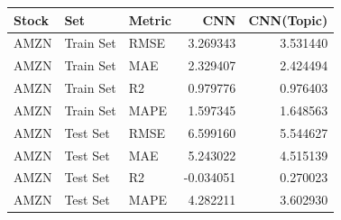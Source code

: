 \begin{tabular}{lllrr}
\toprule
Stock & Set & Metric & CNN & CNN(Topic) \\
\midrule
AMZN & Train Set & RMSE & 3.269343 & 3.531440 \\
AMZN & Train Set & MAE & 2.329407 & 2.424494 \\
AMZN & Train Set & R2 & 0.979776 & 0.976403 \\
AMZN & Train Set & MAPE & 1.597345 & 1.648563 \\
AMZN & Test Set & RMSE & 6.599160 & 5.544627 \\
AMZN & Test Set & MAE & 5.243022 & 4.515139 \\
AMZN & Test Set & R2 & -0.034051 & 0.270023 \\
AMZN & Test Set & MAPE & 4.282211 & 3.602930 \\
\bottomrule
\end{tabular}

